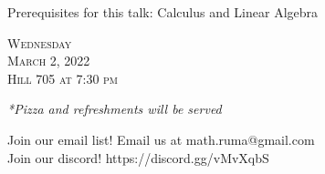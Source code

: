 \documentclass[12pt]{article}
\begin{document}
\begin{center}
\vspace{2mm}

Prerequisites for this talk:  Calculus and Linear Algebra

\vspace{2mm} 
\huge   \textsc{Wednesday\\March 2, 2022 \\Hill 705 at 7:30
  pm}

\vspace{2mm}
\large
\emph{*Pizza and refreshments will be served}

  \Large  Join our email list! Email us at
  math.ruma@gmail.com\\Join our discord!
  https://discord.gg/vMvXqbS
\end{center}
\end{document}

